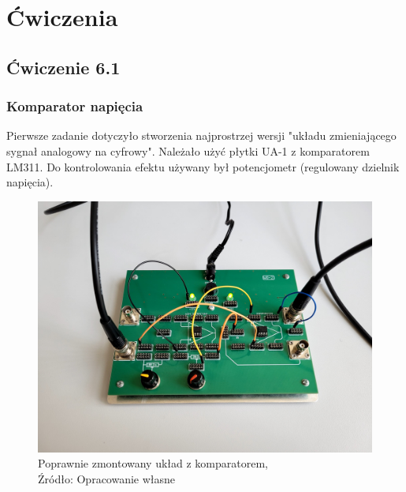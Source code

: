\documentclass{article}
\begin{document}
  \section{Ćwiczenia}
    \subsection{Ćwiczenie 6.1}
      \subsubsection{Komparator napięcia}
        Pierwsze zadanie dotyczyło stworzenia najprostrzej wersji "układu zmieniającego sygnał analogowy na cyfrowy". Należało użyć płytki UA-1 z komparatorem LM311. Do kontrolowania efektu używany był potencjometr (regulowany dzielnik napięcia).

        \begin{figure}[!ht]
          \begin{minipage}{.5\textwidth}
            \centering
            \includegraphics[scale=0.05]{grafiki/komparator_uklad.jpg}
            \caption{Poprawnie zmontowany układ z komparatorem,
            \\Źródło: Opracowanie własne}
          \end{minipage}
          \begin{minipage}{.5\textwidth}
            \centering

\end{minipage}
\end{figure}
\end{document}
